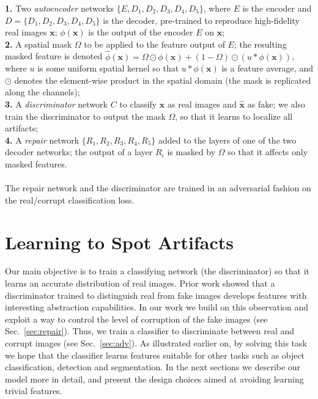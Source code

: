 \documentclass[10pt,twocolumn,letterpaper]{article}
\begin{document}
\noindent\textbf{1.} Two \emph{autoencoder} networks $\{E,D_1,D_2,D_3,D_4,D_5\}$, where $E$ is the encoder and $D = \{D_1,D_2,D_3,D_4,D_5\}$ is the decoder, pre-trained to reproduce high-fidelity real images $\mathbf{x}$; $\phi(\mathbf{x})$ is the output of the encoder $E$ on $\mathbf{x}$;\\
\noindent\textbf{2.} A spatial mask $\Omega$ to be applied to the feature output of $E$; the resulting masked feature is denoted $\hat \phi(\mathbf{x}) = \Omega \odot \phi(\mathbf{x}) + (1-\Omega) \odot (u \ast  \phi(\mathbf{x}))$, where $u$ is some uniform spatial kernel so that $u \ast  \phi(\mathbf{x})$ is a feature average, and $\odot$ denotes the element-wise product in the spatial domain (the mask is replicated along the channels);\\ 
\noindent\textbf{3.} A \emph{discriminator} network $C$ to classify $\mathbf{x}$ as real images and $\hat{\mathbf{x}}$ as fake; we also train the discriminator to output the mask $\Omega$, so that it learns to localize all artifacts;\\
\noindent\textbf{4.} A \emph{repair} network $\{R_1,R_2,R_3,R_4,R_5\}$ added to the layers of one of the two decoder networks; the output of a layer $R_i$ is masked by $\Omega$ so that it affects only masked features.\\~\\
The repair network and the discriminator are trained in an adversarial fashion on the  real/corrupt classification loss.

\section{Learning to Spot Artifacts}

Our main objective is to train a classifying network (the discriminator) so that it learns an accurate distribution of real images. Prior work \cite{radford2015unsupervised} showed that a discriminator trained to distinguish real from fake images develops features with interesting abstraction capabilities. In our work we build on this observation and exploit a way to control the level of corruption of the fake images (see Sec.~\ref{sec:repair}).
Thus, we train a classifier to discriminate between real and corrupt images (see Sec.~\ref{sec:adv}). 
As illustrated earlier on, by solving this task we hope that the classifier learns features suitable for other tasks such as object classification, detection and segmentation. In the next sections we describe our model more in detail, and present the design choices aimed at avoiding learning trivial features.
\end{document}
